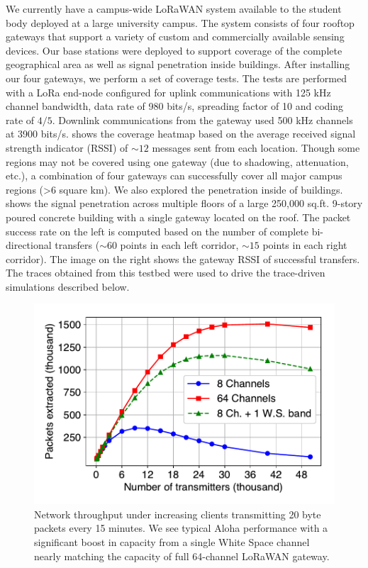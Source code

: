 We currently have a campus-wide LoRaWAN system available to the student body deployed at a large university campus.  The system consists of four rooftop gateways that support a variety of custom and commercially available sensing devices.  Our base stations were deployed to support coverage of the complete geographical area as well as signal penetration inside buildings. After installing our four gateways, we perform a set of coverage tests. The tests are performed with a LoRa end-node configured for uplink communications with 125 kHz channel bandwidth, data rate of 980 bits/s, spreading factor of 10 and coding rate of $4/5$. Downlink communications from the gateway used 500 kHz channels at 3900 bits/s.  shows the coverage heatmap based on the average received signal strength indicator (RSSI) of $\sim 12$ messages sent from each location. Though some regions may not be covered using one gateway (due to shadowing, attenuation, etc.), a combination of four gateways can successfully cover all major campus regions (>6 square km). We also explored the penetration inside of buildings.  shows the signal penetration across multiple floors of a large 250,000 sq.ft. 9-story poured concrete building with a single gateway located on the roof. The packet success rate on the left is computed based on the number of complete bi-directional transfers ($\sim 60$ points in each left corridor, $\sim 15$ points in each right corridor). The image on the right shows the gateway RSSI of successful transfers. The traces obtained from this testbed were used to drive the trace-driven simulations described below.

\begin{figure}[bth]
\centering
\includegraphics[width=0.8\columnwidth]{figures/8vs64channelvswhitespace}
\compactimg
\caption{Network throughput under increasing clients transmitting 20 byte packets every 15 minutes.  We see typical Aloha performance with a significant boost in capacity from a single White Space channel nearly matching the capacity of full 64-channel LoRaWAN gateway.}
\label{fig:ws-scaling}
\end{figure}

